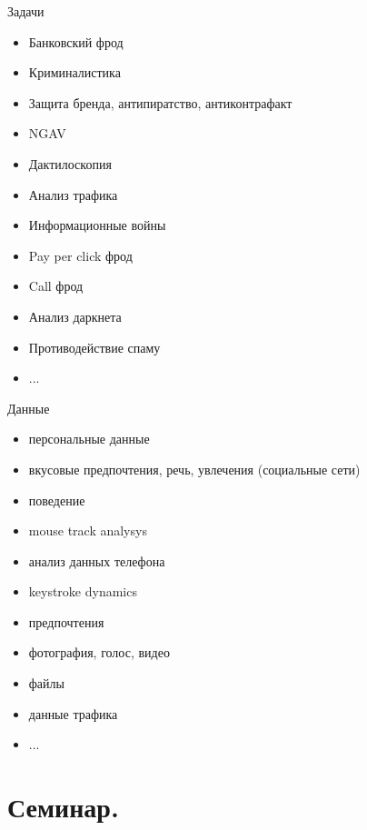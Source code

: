   \begin{frame}{Задачи}
  \begin{itemize}
  	\item Банковский фрод
  	\item Криминалистика
  	\item Защита бренда, антипиратство, антиконтрафакт
  	\item NGAV
  	\item Дактилоскопия
  	\item Анализ трафика
  	\item Информационные войны
  	\item Pay per click фрод
  	\item Call фрод
  	\item Анализ даркнета
  	\item Противодействие спаму
  	\item ...
  \end{itemize} 
  \end{frame}
 
  \begin{frame}{Данные}
  \begin{itemize}
     \item персональные данные
     \item вкусовые предпочтения, речь, увлечения (социальные сети)
     \item поведение
     \item mouse track analysys 
     \item анализ данных телефона
     \item keystroke dynamics
     \item предпочтения
     \item фотография, голос, видео
     \item файлы
     \item данные трафика
     \item ...
  \end{itemize}
  \end{frame}  


 \section{Семинар.}
  
